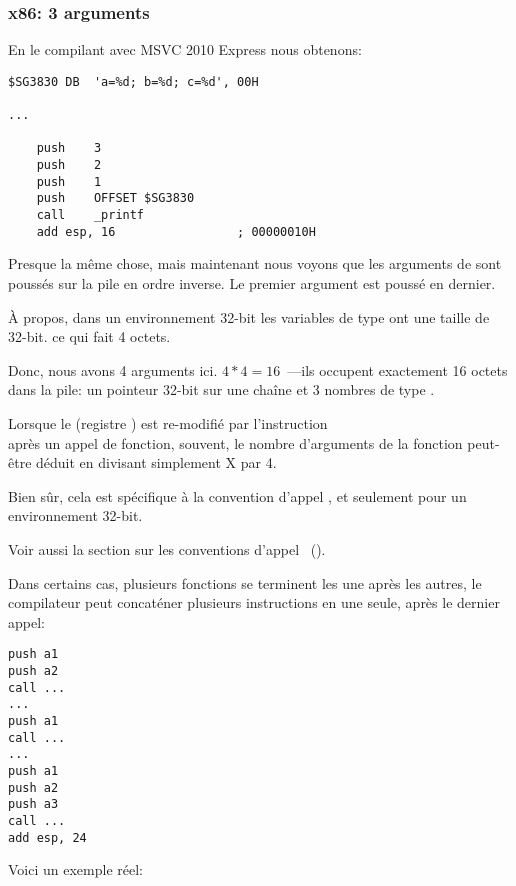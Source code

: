 \subsubsection{x86: 3 arguments}


En le compilant avec MSVC 2010 Express nous obtenons:

\begin{lstlisting}[style=customasmx86]
$SG3830	DB	'a=%d; b=%d; c=%d', 00H

...

	push	3
	push	2
	push	1
	push	OFFSET $SG3830
	call	_printf
	add	esp, 16					; 00000010H
\end{lstlisting}

Presque la même chose, mais maintenant nous voyons que les arguments de \printf sont
poussés sur la pile en ordre inverse. Le premier argument est poussé en dernier.

À propos, dans un environnement 32-bit les variables de type \Tint ont une taille
de 32-bit. ce qui fait 4 octets.

Donc, nous avons 4 arguments ici. $4*4 = 16$~---ils occupent exactement 16 octets
dans la pile: un pointeur 32-bit sur une chaîne et 3 nombres de type \Tint.

Lorsque le  (registre \ESP) est re-modifié
par l'instruction\\  après un appel de fonction, souvent, le nombre
d'arguments de la fonction peut-être déduit en divisant simplement X par 4.

Bien sûr, cela est spécifique à la convention d'appel , et seulement
pour un environnement 32-bit.

Voir aussi la section sur les conventions d'appel ~().

Dans certains cas, plusieurs fonctions se terminent les une après les autres, le
compilateur peut concaténer plusieurs instructions  en une seule,
après le dernier appel:

\begin{lstlisting}[style=customasmx86]
push a1
push a2
call ...
...
push a1
call ...
...
push a1
push a2
push a3
call ...
add esp, 24
\end{lstlisting}

Voici un exemple réel:



